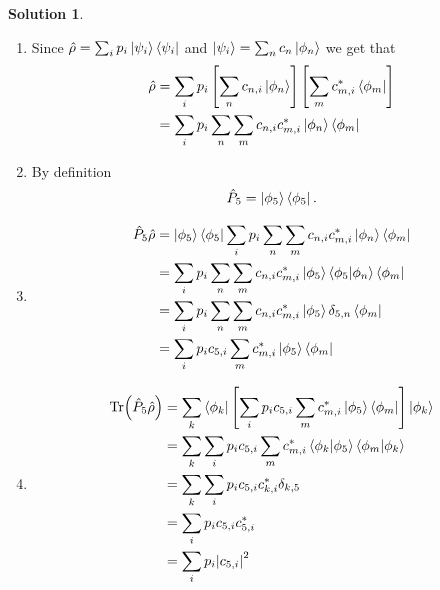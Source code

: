 \documentclass[10pt]{article}
\theoremstyle{definition}
\newtheorem{soln}{Solution}
\begin{document}
\begin{soln}~
  \begin{enumerate}[label=(\alph*)]
    \item Since $\hat{\rho}=\sum_i p_i\ket{\psi_i}\bra{\psi_i}$ and $\ket{\psi_i}=\sum_nc_n\ket{\phi_n}$
          we get that
          \begin{align*}
            \hat{\rho} & =\sum_i p_i\left[\sum_nc_{n,i}\ket{\phi_n}\right]\left[\sum_mc_{m,i}^*\bra{\phi_m}\right] \\
                       & =\sum_i p_i\sum_n\sum_mc_{n,i}c_{m,i}^*\ket{\phi_n}\bra{\phi_m}
          \end{align*}
    \item By definition
          $$\hat{P}_5=\ket{\phi_5}\bra{\phi_5}.$$
    \item \begin{align*}
            \hat{P}_5\hat{\rho} & =\ket{\phi_5}\bra{\phi_5}\sum_i p_i\sum_n\sum_mc_{n,i}c_{m,i}^*\ket{\phi_n}\bra{\phi_m} \\
                                & =\sum_i p_i\sum_n\sum_mc_{n,i}c_{m,i}^*\ket{\phi_5}\bra{\phi_5}\ket{\phi_n}\bra{\phi_m} \\
                                & =\sum_i p_i\sum_n\sum_mc_{n,i}c_{m,i}^*\ket{\phi_5}\delta_{5,n}\bra{\phi_m}             \\
                                & =\sum_i p_ic_{5,i}\sum_m c_{m,i}^*\ket{\phi_5}\bra{\phi_m}
          \end{align*}
    \item \begin{align*}
            \Tr(\hat{P}_5\hat{\rho}) & =\sum_k\bra{\phi_k}\left[\sum_i p_ic_{5,i}\sum_m c_{m,i}^*\ket{\phi_5}\bra{\phi_m}\right]\ket{\phi_k} \\
                                     & =\sum_k\sum_i p_ic_{5,i}\sum_m c_{m,i}^*\bra{\phi_k}\ket{\phi_5}\bra{\phi_m}\ket{\phi_k}              \\
                                     & =\sum_k\sum_i p_ic_{5,i}c_{k,i}^*\delta_{k,5}                                                         \\
                                     & =\sum_i p_ic_{5,i}c_{5,i}^*                                                                           \\
                                     & =\sum_i p_i\abs{c_{5,i}}^2                                                                            \\
          \end{align*}

\end{enumerate}
\end{soln}
\end{document}
